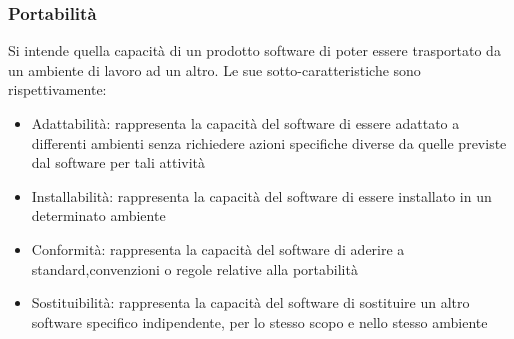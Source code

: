 \subsubsection{Portabilità}
Si intende quella capacità di un prodotto software di poter essere trasportato da un ambiente di lavoro ad un altro. 
Le sue sotto-caratteristiche sono rispettivamente:
\begin{itemize}
\item Adattabilità: rappresenta la capacità del software di essere adattato a differenti ambienti senza richiedere azioni specifiche diverse da quelle previste dal software per tali attività
\item Installabilità: rappresenta la capacità del software di essere installato in un determinato ambiente
\item Conformità: rappresenta la capacità del software di aderire a standard,convenzioni o regole relative alla portabilità
\item Sostituibilità: rappresenta la capacità del software di sostituire un altro software specifico indipendente, per lo stesso scopo e nello stesso ambiente
\end{itemize}